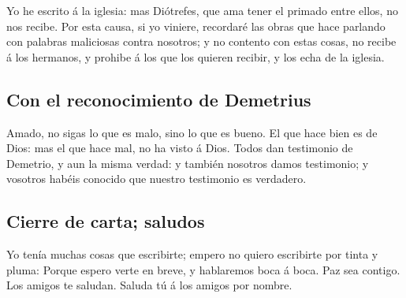  Yo he escrito á la iglesia: mas Diótrefes, que ama tener el
primado entre ellos, no nos recibe.  Por esta causa, si yo
viniere, recordaré las obras que hace parlando con palabras maliciosas
contra nosotros; y no contento con estas cosas, no recibe á los
hermanos, y prohibe á los que los quieren recibir, y los echa de la
iglesia.

\hypertarget{con-el-reconocimiento-de-demetrius}{%
\subsection{Con el reconocimiento de
Demetrius}\label{con-el-reconocimiento-de-demetrius}}

 Amado, no sigas lo que es malo, sino lo que es bueno. El
que hace bien es de Dios: mas el que hace mal, no ha visto á Dios.
 Todos dan testimonio de Demetrio, y aun la misma verdad: y
también nosotros damos testimonio; y vosotros habéis conocido que
nuestro testimonio es verdadero.

\hypertarget{cierre-de-carta-saludos}{%
\subsection{Cierre de carta; saludos}\label{cierre-de-carta-saludos}}

 Yo tenía muchas cosas que escribirte; empero no quiero
escribirte por tinta y pluma:  Porque espero verte en
breve, y hablaremos boca á boca. Paz sea contigo. Los amigos te saludan.
Saluda tú á los amigos por nombre.
